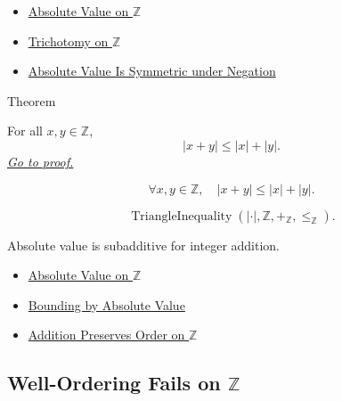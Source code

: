 \begin{dependencies}
\begin{itemize}
  \item \hyperref[def:absolute-value-on-z]{Absolute Value on $\mathbb{Z}$}
  \item \hyperref[thm:trichotomy-on-z]{Trichotomy on $\mathbb{Z}$}
  \item \hyperref[thm:absolute-value-negation-on-z]{Absolute Value Is Symmetric under Negation}
\end{itemize}
\end{dependencies}

\begin{theorembox}{Theorem}
\begin{theorem}
\label{thm:triangle-inequality-on-z}
For all $x,y\in\mathbb{Z}$,
\[
|x+y|\le |x|+|y|.
\]
\hyperref[prf:triangle-inequality-on-z]{\textit{Go to proof.}}
\end{theorem}
\end{theorembox}

\begin{remark*}
\[
\forall x,y\in\mathbb{Z},\quad |x+y|\le |x|+|y|.
\]
\end{remark*}

\begin{remark*}
\[
\operatorname{TriangleInequality}(|\cdot|,\mathbb{Z},+_{\mathbb{Z}},\le_{\mathbb{Z}}).
\]
\end{remark*}

\begin{remark*}[Interpretation]
Absolute value is subadditive for integer addition.
\end{remark*}

\begin{dependencies}
\begin{itemize}
  \item \hyperref[def:absolute-value-on-z]{Absolute Value on $\mathbb{Z}$}
  \item \hyperref[thm:absolute-value-bounds-on-z]{Bounding by Absolute Value}
  \item \hyperref[thm:addition-preserves-order-on-z]{Addition Preserves Order on $\mathbb{Z}$}
\end{itemize}
\end{dependencies}

\subsection*{\texorpdfstring{Well-Ordering Fails on $\mathbb{Z}$}{Well-Ordering Fails on Z}}

